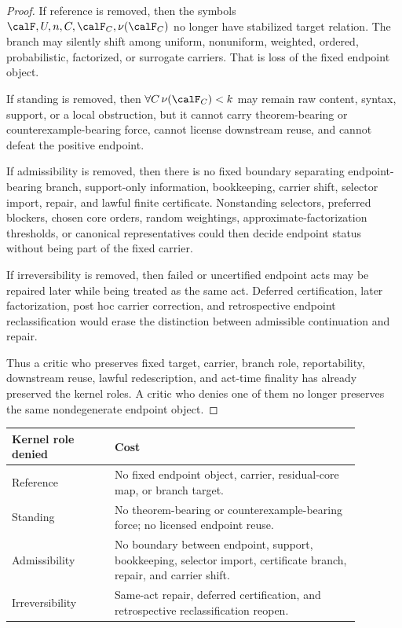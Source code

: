 \documentclass[11pt]{article}
\begin{document}
\begin{proof}
If reference is removed, then the symbols \(\calF,U,n,C,\calF_C,\nu(\calF_C)\) no longer have stabilized target relation.  The branch may silently shift among uniform, nonuniform, weighted, ordered, probabilistic, factorized, or surrogate carriers.  That is loss of the fixed endpoint object.

If standing is removed, then \(\forall C\,\nu(\calF_C)<k\) may remain raw content, syntax, support, or a local obstruction, but it cannot carry theorem-bearing or counterexample-bearing force, cannot license downstream reuse, and cannot defeat the positive endpoint.

If admissibility is removed, then there is no fixed boundary separating endpoint-bearing branch, support-only information, bookkeeping, carrier shift, selector import, repair, and lawful finite certificate.  Nonstanding selectors, preferred blockers, chosen core orders, random weightings, approximate-factorization thresholds, or canonical representatives could then decide endpoint status without being part of the fixed carrier.

If irreversibility is removed, then failed or uncertified endpoint acts may be repaired later while being treated as the same act.  Deferred certification, later factorization, post hoc carrier correction, and retrospective endpoint reclassification would erase the distinction between admissible continuation and repair.

Thus a critic who preserves fixed target, carrier, branch role, reportability, downstream reuse, lawful redescription, and act-time finality has already preserved the kernel roles.  A critic who denies one of them no longer preserves the same nondegenerate endpoint object.
\end{proof}

\begin{center}
\begin{tabular}{p{0.26\linewidth}p{0.62\linewidth}}
\toprule
Kernel role denied & Cost \\
\midrule
Reference & No fixed endpoint object, carrier, residual-core map, or branch target. \\
Standing & No theorem-bearing or counterexample-bearing force; no licensed endpoint reuse. \\
Admissibility & No boundary between endpoint, support, bookkeeping, selector import, certificate branch, repair, and carrier shift. \\
Irreversibility & Same-act repair, deferred certification, and retrospective reclassification reopen. \\
\bottomrule
\end{tabular}
\end{center}
\end{document}
